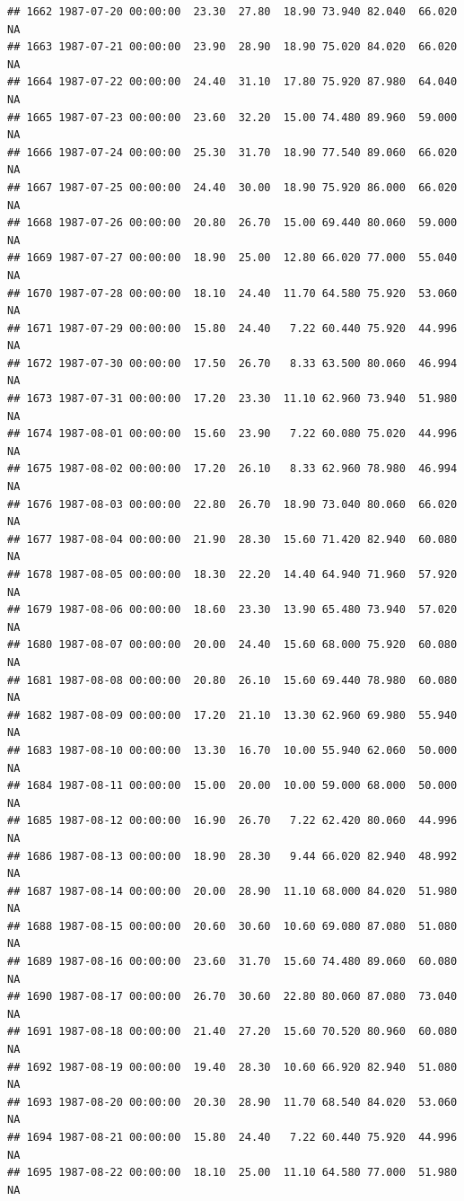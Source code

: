 \documentclass{article}\usepackage{graphicx, color}
\makeatletter
\newenvironment{kframe}{%
 \def\at@end@of@kframe{}%
 \ifinner\ifhmode%
  \def\at@end@of@kframe{\end{minipage}}%
  \begin{minipage}{\columnwidth}%
 \fi\fi%
 \def\FrameCommand##1{\hskip\@totalleftmargin \hskip-\fboxsep
 \colorbox{shadecolor}{##1}\hskip-\fboxsep
     \hskip-\linewidth \hskip-\@totalleftmargin \hskip\columnwidth}%
 \MakeFramed {\advance\hsize-\width
   \@totalleftmargin\z@ \linewidth\hsize
   \@setminipage}}%
 {\par\unskip\endMakeFramed%
 \at@end@of@kframe}
\newenvironment{knitrout}{}{} %
\makeatother
\begin{document}
\begin{knitrout}
\begin{kframe}
\begin{verbatim}
## 1662 1987-07-20 00:00:00  23.30  27.80  18.90 73.940 82.040  66.020     NA
## 1663 1987-07-21 00:00:00  23.90  28.90  18.90 75.020 84.020  66.020     NA
## 1664 1987-07-22 00:00:00  24.40  31.10  17.80 75.920 87.980  64.040     NA
## 1665 1987-07-23 00:00:00  23.60  32.20  15.00 74.480 89.960  59.000     NA
## 1666 1987-07-24 00:00:00  25.30  31.70  18.90 77.540 89.060  66.020     NA
## 1667 1987-07-25 00:00:00  24.40  30.00  18.90 75.920 86.000  66.020     NA
## 1668 1987-07-26 00:00:00  20.80  26.70  15.00 69.440 80.060  59.000     NA
## 1669 1987-07-27 00:00:00  18.90  25.00  12.80 66.020 77.000  55.040     NA
## 1670 1987-07-28 00:00:00  18.10  24.40  11.70 64.580 75.920  53.060     NA
## 1671 1987-07-29 00:00:00  15.80  24.40   7.22 60.440 75.920  44.996     NA
## 1672 1987-07-30 00:00:00  17.50  26.70   8.33 63.500 80.060  46.994     NA
## 1673 1987-07-31 00:00:00  17.20  23.30  11.10 62.960 73.940  51.980     NA
## 1674 1987-08-01 00:00:00  15.60  23.90   7.22 60.080 75.020  44.996     NA
## 1675 1987-08-02 00:00:00  17.20  26.10   8.33 62.960 78.980  46.994     NA
## 1676 1987-08-03 00:00:00  22.80  26.70  18.90 73.040 80.060  66.020     NA
## 1677 1987-08-04 00:00:00  21.90  28.30  15.60 71.420 82.940  60.080     NA
## 1678 1987-08-05 00:00:00  18.30  22.20  14.40 64.940 71.960  57.920     NA
## 1679 1987-08-06 00:00:00  18.60  23.30  13.90 65.480 73.940  57.020     NA
## 1680 1987-08-07 00:00:00  20.00  24.40  15.60 68.000 75.920  60.080     NA
## 1681 1987-08-08 00:00:00  20.80  26.10  15.60 69.440 78.980  60.080     NA
## 1682 1987-08-09 00:00:00  17.20  21.10  13.30 62.960 69.980  55.940     NA
## 1683 1987-08-10 00:00:00  13.30  16.70  10.00 55.940 62.060  50.000     NA
## 1684 1987-08-11 00:00:00  15.00  20.00  10.00 59.000 68.000  50.000     NA
## 1685 1987-08-12 00:00:00  16.90  26.70   7.22 62.420 80.060  44.996     NA
## 1686 1987-08-13 00:00:00  18.90  28.30   9.44 66.020 82.940  48.992     NA
## 1687 1987-08-14 00:00:00  20.00  28.90  11.10 68.000 84.020  51.980     NA
## 1688 1987-08-15 00:00:00  20.60  30.60  10.60 69.080 87.080  51.080     NA
## 1689 1987-08-16 00:00:00  23.60  31.70  15.60 74.480 89.060  60.080     NA
## 1690 1987-08-17 00:00:00  26.70  30.60  22.80 80.060 87.080  73.040     NA
## 1691 1987-08-18 00:00:00  21.40  27.20  15.60 70.520 80.960  60.080     NA
## 1692 1987-08-19 00:00:00  19.40  28.30  10.60 66.920 82.940  51.080     NA
## 1693 1987-08-20 00:00:00  20.30  28.90  11.70 68.540 84.020  53.060     NA
## 1694 1987-08-21 00:00:00  15.80  24.40   7.22 60.440 75.920  44.996     NA
## 1695 1987-08-22 00:00:00  18.10  25.00  11.10 64.580 77.000  51.980     NA

\end{verbatim}
\end{kframe}
\end{knitrout}
\end{document}
